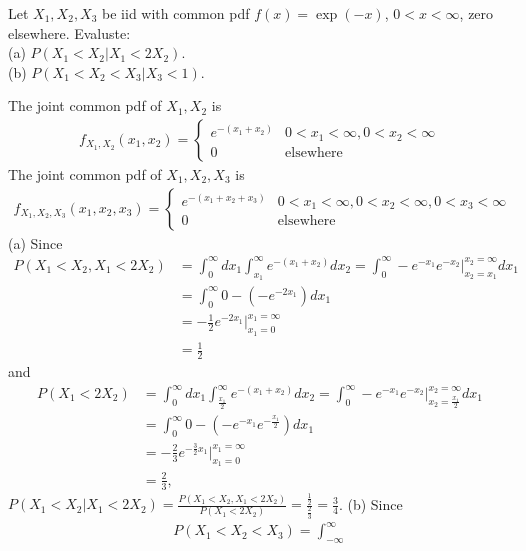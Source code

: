 \begin{exercise}{}{}
    Let $X_1,X_2,X_3$ be iid with common pdf $f(x)=\exp(-x)$, $0<x<\infty$,
    zero elsewhere. Evaluste:\\
    (a) $P(X_1<X_2|X_1<2X_2)$.\\
    (b) $P(X_1<X_2<X_3|X_3<1)$.
\end{exercise}
\begin{solve}
    The joint common pdf of $X_1,X_2$ is
    \begin{align*}
        f_{X_1,X_2}(x_1,x_2)= \left\{\begin{matrix}
            e^{-(x_1+x_2)} & 0<x_1<\infty,0<x_2<\infty\\
            0 & \text{elsewhere}
            \end{matrix}\right.
    \end{align*}
    The joint common pdf of $X_1,X_2,X_3$ is 
    \begin{align*}
        f_{X_1,X_2,X_3}(x_1,x_2,x_3)= \left\{\begin{matrix}
            e^{-(x_1+x_2+x_3)} & 0<x_1<\infty,0<x_2<\infty,0<x_3<\infty \\
            0 & \text{elsewhere}
            \end{matrix}\right.
    \end{align*}
    (a) Since
    \begin{align*}
        P(X_1<X_2,X_1<2X_2)&=\int_{0}^{\infty}dx_1\int_{x_1}^{\infty}e^{-(x_1+x_2)} dx_2 = \int_{0}^{\infty}-e^{-x_1}e^{-x_2}|_{x_2=x_1}^{x_2=\infty}dx_1\\
                           &= \int_{0}^{\infty}0-(-e^{-2x_1})dx_1\\
                           &= -\frac{1}{2}e^{-2x_1}|_{x_1=0}^{x_1=\infty}\\
                           &= \frac{1}{2}
    \end{align*}
    and 
    \begin{align*}
        P(X_1<2X_2)&=\int_{0}^{\infty}dx_1\int_{\frac{x_1}{2}}^{\infty}e^{-(x_1+x_2)} dx_2 = \int_{0}^{\infty}-e^{-x_1}e^{-x_2}|_{x_2=\frac{x_1}{2}}^{x_2=\infty}dx_1\\
                           &= \int_{0}^{\infty}0-(-e^{-x_1}e^{-\frac{x_1}{2}})dx_1\\
                           &= -\frac{2}{3}e^{-\frac{3}{2}x_1}|_{x_1=0}^{x_1=\infty}\\
                           &= \frac{2}{3},
    \end{align*}
    $P(X_1<X_2|X_1<2X_2)=\frac{P(X_1<X_2,X_1<2X_2)}{P(X_1<2X_2)}=\frac{\frac{1}{2}}{\frac{2}{3}}=\frac{3}{4}$.
    (b) Since
    \begin{align*}
        P(X_1<X_2<X_3)=\int_{-\infty}^{\infty}
    \end{align*}
\end{solve}



